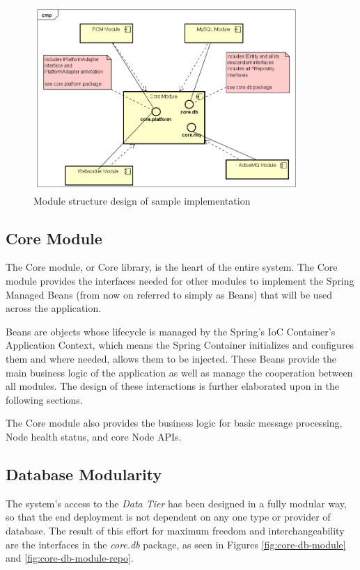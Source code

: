 \begin{figure}[H]
	\centering
	\includegraphics[width=0.9\textwidth]{figures/03_design/s-impl-comps}
    \caption{Module structure design of sample implementation}
    \label{fig:s-impl-comps}
\end{figure}

\subsection{Core Module}
The Core module, or Core library, is the heart of the entire system. The Core module provides the interfaces needed for other modules to implement the Spring Managed Beans (from now on referred to simply as Beans) that will be used across the application. 

Beans are objects whose lifecycle is managed by the Spring's IoC Container's Application Context, which means the Spring Container initializes and configures them and where needed, allows them to be injected\cite{spring-beans}. These Beans provide the main business logic of the application as well as manage the cooperation between all modules. The design of these interactions is further elaborated upon in the following sections.

The Core module also provides the business logic for basic message processing, Node health status, and core Node APIs.

\subsection{Database Modularity} \label{design:database-modularity}
The system's access to the \textit{Data Tier} has been designed in a fully modular way, so that the end deployment is not dependent on any one type or provider of database. The result of this effort for maximum freedom and interchangeability are the interfaces in the \textit{core.db} package, as seen in Figures \ref{fig:core-db-module} and \ref{fig:core-db-module-repo}.

